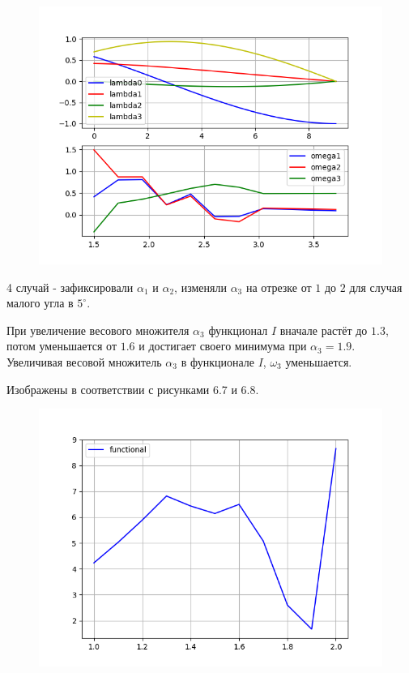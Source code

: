 \documentclass[14pt]{extreport}
\begin{document}
\begin{figure}[H]
\center\includegraphics[scale=0.8]{fig/ivp_and_control_alpha2_1_5-3_7_50.png}
\caption{}
\end{figure}

4 случай - зафиксировали $\alpha_1$ и $\alpha_2$, изменяли $\alpha_3$ на отрезке от $1$ до $2$ для случая малого угла в $5^{\circ}$.

При увеличение весового множителя $\alpha_3$ функционал $I$ вначале растёт до $1.3$, потом уменьшается от $1.6$ и достигает своего минимума при $\alpha_3 = 1.9$. Увеличивая весовой множитель $\alpha_3$ в функционале $I$, $\omega_3$ уменьшается.

Изображены в соответствии с рисунками 6.7 и 6.8.

\begin{figure}[H]
\center\includegraphics[scale=0.8]{fig/functional_alpha2_1-2_5.png}
\caption{}
\end{figure}
\end{document}
